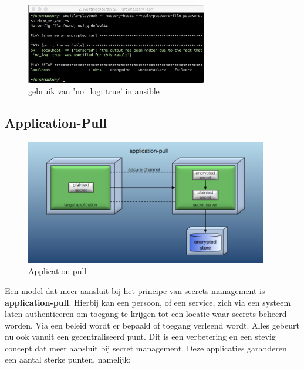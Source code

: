 \begin{figure}[htbp]
\centerline{\includegraphics[width=300]{bachproef/img/nolog.png}}
\caption{gebruik van 'no\_log: true' in ansible \autocite{GB2018}}
\label{fig:nolog}
\end{figure}

\newpage
\subsection{Application-Pull}

\begin{figure}[htbp]
\centerline{\includegraphics[width=400]{bachproef/img/application-pull.png}}
\caption{Application-pull \autocite{Somerfield2015}}
\label{fig}
\end{figure}

Een model dat meer aansluit bij het principe van secrets management is \textbf{application-pull}. Hierbij kan een persoon, of een service, zich via een systeem laten authenticeren om toegang te krijgen tot een locatie waar secrets beheerd worden. Via een beleid wordt er bepaald of toegang verleend wordt. Alles gebeurt nu ook vanuit een gecentraliseerd punt. Dit is een verbetering en een stevig concept dat meer aansluit bij secret management. Deze applicaties garanderen een aantal sterke punten, namelijk:

